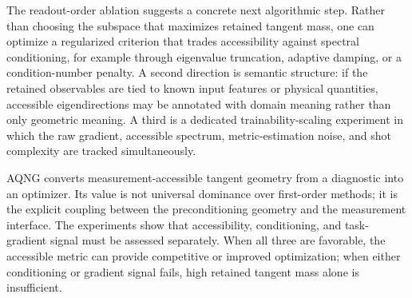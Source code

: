 The readout-order ablation suggests a concrete next algorithmic step. Rather than choosing the subspace that maximizes retained tangent mass, one can optimize a regularized criterion that trades accessibility against spectral conditioning, for example through eigenvalue truncation, adaptive damping, or a condition-number penalty. A second direction is semantic structure: if the retained observables are tied to known input features or physical quantities, accessible eigendirections may be annotated with domain meaning rather than only geometric meaning. A third is a dedicated trainability-scaling experiment in which the raw gradient, accessible spectrum, metric-estimation noise, and shot complexity are tracked simultaneously.

AQNG converts measurement-accessible tangent geometry from a diagnostic into an optimizer. Its value is not universal dominance over first-order methods; it is the explicit coupling between the preconditioning geometry and the measurement interface. The experiments show that accessibility, conditioning, and task-gradient signal must be assessed separately. When all three are favorable, the accessible metric can provide competitive or improved optimization; when either conditioning or gradient signal fails, high retained tangent mass alone is insufficient.
